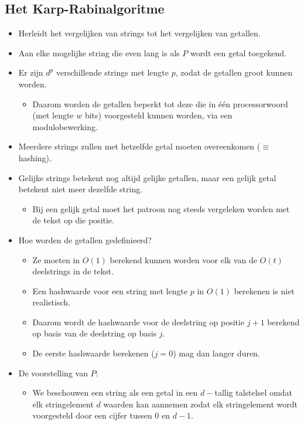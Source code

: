 \subsection{Het Karp-Rabinalgoritme}
\begin{itemize}
    \item Herleidt het vergelijken van strings tot het vergelijken van getallen.
    \item Aan elke mogelijke string die even lang is als $P$ wordt een getal toegekend.
    \item Er zijn $d^p$ verschillende strings met lengte $p$, zodat de getallen groot kunnen worden.
    \begin{itemize}
        \item Daarom worden de getallen beperkt tot deze die in één processorwoord (met lengte $w$ bits) voorgesteld kunnen worden, via een modulobewerking.
    \end{itemize}
    
    \item Meerdere strings zullen met hetzelfde getal moeten overeenkomen ($\equiv$ hashing).
    \item Gelijke strings betekent nog altijd gelijke getallen, maar een gelijk getal betekent niet meer dezelfde string.
    \begin{itemize}
        \item Bij een gelijk getal moet het patroon nog steeds vergeleken worden met de tekst op die positie.
    \end{itemize}
    \item Hoe worden de getallen gedefinieerd?
    \begin{itemize}
        \item Ze moeten in $O(1)$ berekend kunnen worden voor elk van de $O(t)$ deelstrings in de tekst.
        \item Een hashwaarde voor een string met lengte $p$ in $O(1)$ berekenen is niet realistisch.
        \item Daarom wordt de hashwaarde voor de deelstring op positie $j + 1$ berekend op basis van de deelstring op basis $j$.
        \item De eerste hashwaarde berekenen ($j = 0$) mag dan langer duren.
    \end{itemize}
    

    \item De voorstelling van $P$:
    \begin{itemize}
        \item We beschouwen een string als een getal in een $d-$tallig talstelsel omdat elk stringelement $d$ waarden kan aannemen zodat elk stringelement wordt voorgesteld door een cijfer tussen 0 en $d - 1$.
        

\end{itemize}
\end{itemize}
